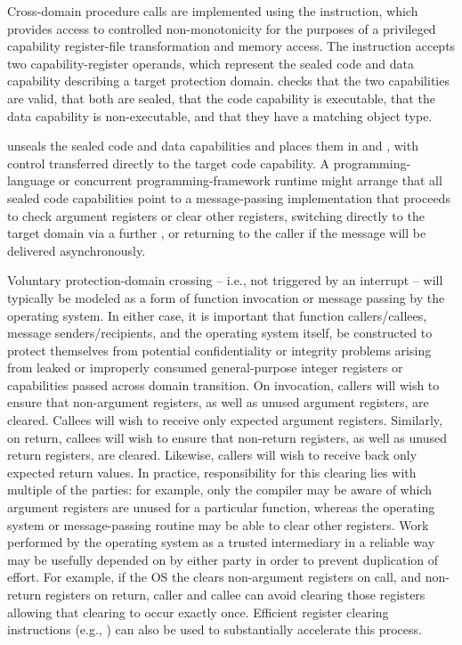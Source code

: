 Cross-domain procedure calls are implemented using the 
instruction, which provides access to controlled non-monotonicity for the
purposes of a privileged capability register-file transformation and memory
access.
The instruction accepts two capability-register operands, which represent the
sealed code and data capability describing a target protection domain.
 checks that the two capabilities are valid, that both are
sealed, that the code capability is executable, that the data capability is
non-executable, and that they have a matching object type.

 unseals the sealed code and data capabilities
and places them in \PCC{} and \IDC{}, with control transferred
directly to the target code capability.
A programming-language or concurrent programming-framework runtime might
arrange that all sealed code capabilities point to a message-passing
implementation that proceeds to check argument registers or clear other
registers, switching directly to the target domain via a further
, or returning to the caller if the message will be delivered
asynchronously.

Voluntary protection-domain crossing -- i.e., not triggered by an interrupt --
will typically be modeled as a form of function invocation or message passing
by the operating system.
In either case, it is important that function callers/callees, message
senders/recipients, and the operating system itself, be constructed to protect
themselves from potential confidentiality or integrity problems arising from
leaked or improperly consumed general-purpose integer registers or
capabilities passed across domain transition.
On invocation, callers will wish to ensure that non-argument registers, as
well as unused argument registers, are cleared.
Callees will wish to receive only expected argument registers.
Similarly, on return, callees will wish to ensure that non-return registers,
as well as unused return registers, are cleared.
Likewise, callers will wish to receive back only expected return values.
In practice, responsibility for this clearing lies with multiple of the
parties: for example, only the compiler may be aware of which argument
registers are unused for a particular function, whereas the operating system
or message-passing routine may be able to clear other registers.
Work performed by the operating system as a trusted intermediary in a
reliable way may be usefully depended on by either party in order to prevent
duplication of effort.
For example, if the OS the clears non-argument
registers on call, and non-return registers on return, caller and
callee can avoid clearing those registers allowing that clearing
to occur exactly once.
Efficient register clearing instructions (e.g., ) can
also be used to substantially accelerate this process.


